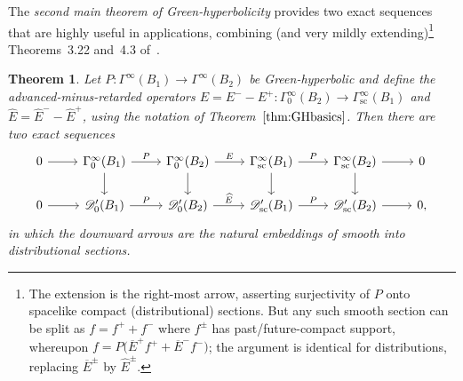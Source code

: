 \documentclass[pdftex]{sigma}
\numberwithin{equation}{section}
\newtheorem{Theorem}{Theorem}[section]
\newcommand{\GoinX}[1]{\Gamma_0^\infty({#1})}
\newcommand{\DD}{{\mathscr D}}
\begin{document}
 The \emph{second main theorem of Green-hyperbolicity} provides two exact sequences that are highly useful in applications, combining (and very mildly extending)\footnote{The extension is the right-most arrow, asserting surjectivity of $P$ onto spacelike compact (distributional) sections. But any such smooth section can be split as $f=f^++f^-$ where $f^\pm$ has past/future-compact support, whereupon $f=P\big( \overline{E}^+f^++\overline{E}^-f^-\big)$; the argument is identical for distributions, replacing $\overline{E}^\pm$ by $\widehat{E}^\pm$.} Theorems~3.22 and~4.3 of~\cite{Baer:2015}.
 \begin{Theorem} \label{thm:exact}
 	Let $P\colon\Gamma^\infty(B_1)\to \Gamma^\infty(B_2)$ be Green-hyperbolic and define the advanced-minus-retarded operators
 	$E=E^--E^+\colon\Gamma^\infty_0(B_2)\to\Gamma^\infty_{\mathrm{sc}}(B_1)$ and $\widehat{E}=\widehat{E}^--\widehat{E}^+$, using the notation of Theorem~$\ref{thm:GHbasics}$. Then there are two exact sequences
 	\begin{equation*}%
 		\begin{tikzcd}
 			0 \arrow[r] & \GoinX{B_1} \arrow[r, "P"]\arrow[d] &\GoinX{B_2} \arrow[r, "E"]\arrow[d] & \Gamma^\infty_{\mathrm{sc}}(B_1) \arrow[r,"P"]\arrow[d] & \Gamma^\infty_{\mathrm{sc}}(B_2) \arrow[r]\arrow[d] & 0 \\
 			0 \arrow[r] & \DD'_0(B_1) \arrow[r, "P"] & \DD'_0(B_2) \arrow[r, "\widehat{E}"] & \DD'_{\mathrm{sc}}(B_1) \arrow[r,"P"] & \DD'_{\mathrm{sc}}(B_2) \arrow[r] & 0,
 		\end{tikzcd}
 	\end{equation*}
 	in which the downward arrows are the natural embeddings of smooth into distributional sections.
 \end{Theorem}
\end{document}
